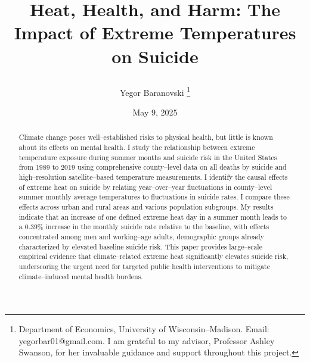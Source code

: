 \documentclass[12pt, a4paper]{article}
\begin{document}
\title{{\vspace{--2cm} \textbf{{Heat, Health, and Harm: The Impact of Extreme Temperatures on Suicide}}}

\author{\normalsize{Yegor Baranovski}
\thanks{Department of Economics, University of Wisconsin--Madison. Email: yegorbar01@gmail.com. I am grateful to my advisor, Professor Ashley Swanson, for her invaluable guidance and support throughout this project.}   } }

\vspace{--0.0in}
\date{\normalsize{ \vspace{0.0in} May 9, 2025  \\ \vspace{0.0in} 
}
} 
\maketitle

\thispagestyle{empty}%
\vspace{--0.5cm} 

\begin{abstract}
\noindent  

Climate change poses well--established risks to physical health, but little is known about its effects on mental health.  I study the relationship between extreme temperature exposure during summer months and suicide risk in the United States from 1989 to 2019 using comprehensive county--level data on all deaths by suicide and high--resolution satellite--based temperature measurements. I identify the causal effects of extreme heat on suicide by relating year--over--year fluctuations in county--level summer monthly average temperatures to fluctuations in suicide rates. I compare these effects across urban and rural areas and various population subgroups. My results indicate that an increase of one defined extreme heat day in a summer month leads to a 0.39\% increase in the monthly suicide rate relative to the baseline, with effects concentrated among men and working--age adults, demographic groups already characterized by elevated baseline suicide risk. This paper provides large--scale empirical evidence that climate--related extreme heat significantly elevates suicide risk, underscoring the urgent need for targeted public health interventions to mitigate climate--induced mental health burdens.



\end{abstract} 
\newpage
\tableofcontents
\thispagestyle{empty}
\newpage
\end{document}
